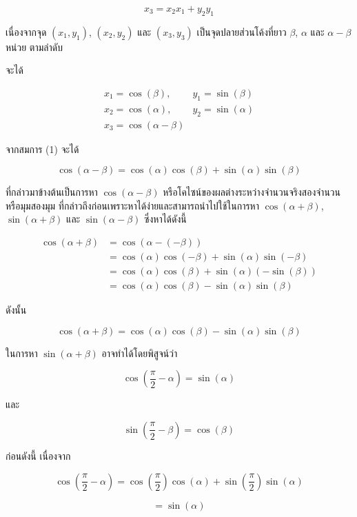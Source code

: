 \begin{equation*}
	x_{3}=x_{2}x_{1}+y_{2}y_{1}
	\tag{1}
\end{equation*}

\noindent เนื่องจากจุด $(x_{1},y_{1})$, $(x_{2},y_{2})$ และ $(x_{3},y_{3})$ เป็นจุดปลายส่วนโค้งที่ยาว $\beta$, $\alpha$ และ $\alpha-\beta$ หน่วย ตามลำดับ

จะได้

\[
\begin{array}{ll}
	x_{1}=\cos(\beta), & y_{1}=\sin(\beta) \\
	x_{2}=\cos(\alpha), & y_{2}=\sin(\alpha) \\
	x_{3}=\cos(\alpha-\beta) &
\end{array}
\]

\noindent จากสมการ (1) จะได้

\[
\cos(\alpha-\beta)
=
\cos(\alpha)\cos(\beta)
+
\sin(\alpha)\sin(\beta)
\]

\medskip

\noindent ที่กล่าวมาข้างต้นเป็นการหา $\cos(\alpha-\beta)$ หรือโคไซน์ของผลต่างระหว่างจำนวนจริงสองจำนวนหรือมุมสองมุม ที่กล่าวถึงก่อนเพราะหาได้ง่ายและสามารถนำไปใช้ในการหา $\cos(\alpha+\beta)$, $\sin(\alpha+\beta)$ และ $\sin(\alpha-\beta)$ ซึ่งหาได้ดังนี้

\[
\begin{aligned}
	\cos(\alpha+\beta)
	&=
	\cos(\alpha-(-\beta))
	\\
	&=
	\cos(\alpha)\cos(-\beta)
	+
	\sin(\alpha)\sin(-\beta)
	\\
	&=
	\cos(\alpha)\cos(\beta)
	+
	\sin(\alpha)(-\sin(\beta))
	\\
	&=
	\cos(\alpha)\cos(\beta)
	-
	\sin(\alpha)\sin(\beta)
\end{aligned}
\]

\noindent ดังนั้น

\[
\cos(\alpha+\beta)
=
\cos(\alpha)\cos(\beta)
-
\sin(\alpha)\sin(\beta)
\]

ในการหา $\sin(\alpha+\beta)$ อาจทำได้โดยพิสูจน์ว่า

\[
\cos\left(\dfrac{\pi}{2}-\alpha\right)=\sin(\alpha)
\]

และ

\[
\sin\left(\dfrac{\pi}{2}-\beta\right)=\cos(\beta)
\]

ก่อนดังนี้ เนื่องจาก

\[
\cos\left(\dfrac{\pi}{2}-\alpha\right)
=
\cos\left(\dfrac{\pi}{2}\right)\cos(\alpha)
+
\sin\left(\dfrac{\pi}{2}\right)\sin(\alpha)
\]

\[
=\sin(\alpha)
\]

